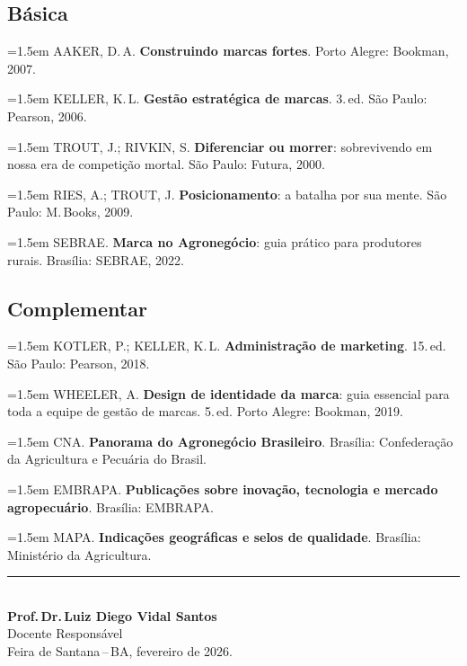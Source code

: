 \documentclass[11pt,a4paper]{article}
\begin{document}
\subsection*{Básica}

\begin{small}
\hangindent=1.5em
AAKER, D.\,A. \textbf{Construindo marcas fortes}. Porto Alegre: Bookman, 2007.\par\medskip

\hangindent=1.5em
KELLER, K.\,L. \textbf{Gestão estratégica de marcas}. 3.\,ed. São Paulo: Pearson, 2006.\par\medskip

\hangindent=1.5em
TROUT, J.; RIVKIN, S. \textbf{Diferenciar ou morrer}: sobrevivendo em nossa era de competição mortal. São Paulo: Futura, 2000.\par\medskip

\hangindent=1.5em
RIES, A.; TROUT, J. \textbf{Posicionamento}: a batalha por sua mente. São Paulo: M.\,Books, 2009.\par\medskip

\hangindent=1.5em
SEBRAE. \textbf{Marca no Agronegócio}: guia prático para produtores rurais. Brasília: SEBRAE, 2022.\par\medskip
\end{small}

\subsection*{Complementar}

\begin{small}
\hangindent=1.5em
KOTLER, P.; KELLER, K.\,L. \textbf{Administração de marketing}. 15.\,ed. São Paulo: Pearson, 2018.\par\medskip

\hangindent=1.5em
WHEELER, A. \textbf{Design de identidade da marca}: guia essencial para toda a equipe de gestão de marcas. 5.\,ed. Porto Alegre: Bookman, 2019.\par\medskip

\hangindent=1.5em
CNA. \textbf{Panorama do Agronegócio Brasileiro}. Brasília: Confederação da Agricultura e Pecuária do Brasil.\par\medskip

\hangindent=1.5em
EMBRAPA. \textbf{Publicações sobre inovação, tecnologia e mercado agropecuário}. Brasília: EMBRAPA.\par\medskip

\hangindent=1.5em
MAPA. \textbf{Indicações geográficas e selos de qualidade}. Brasília: Ministério da Agricultura.\par\medskip
\end{small}



\vfill

\begin{center}
\noindent\rule{6cm}{0.4pt}\\[6pt]
\textbf{Prof.\,Dr.\,Luiz Diego Vidal Santos}\\
Docente Responsável\\[4pt]
{\small Feira de Santana\,--\,BA, fevereiro de 2026.}
\end{center}
\end{document}
